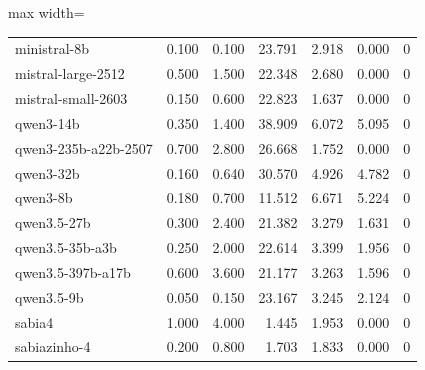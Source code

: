 \begin{table}[htbp]
\begin{adjustbox}{max width=\linewidth}
\begin{tabular}{lrrrrrr}
ministral-8b & 0.100 & 0.100 & 23.791 & 2.918 & 0.000 & 0 \\
mistral-large-2512 & 0.500 & 1.500 & 22.348 & 2.680 & 0.000 & 0 \\
mistral-small-2603 & 0.150 & 0.600 & 22.823 & 1.637 & 0.000 & 0 \\
qwen3-14b & 0.350 & 1.400 & 38.909 & 6.072 & 5.095 & 0 \\
qwen3-235b-a22b-2507 & 0.700 & 2.800 & 26.668 & 1.752 & 0.000 & 0 \\
qwen3-32b & 0.160 & 0.640 & 30.570 & 4.926 & 4.782 & 0 \\
qwen3-8b & 0.180 & 0.700 & 11.512 & 6.671 & 5.224 & 0 \\
qwen3.5-27b & 0.300 & 2.400 & 21.382 & 3.279 & 1.631 & 0 \\
qwen3.5-35b-a3b & 0.250 & 2.000 & 22.614 & 3.399 & 1.956 & 0 \\
qwen3.5-397b-a17b & 0.600 & 3.600 & 21.177 & 3.263 & 1.596 & 0 \\
qwen3.5-9b & 0.050 & 0.150 & 23.167 & 3.245 & 2.124 & 0 \\
sabia4 & 1.000 & 4.000 & 1.445 & 1.953 & 0.000 & 0 \\
sabiazinho-4 & 0.200 & 0.800 & 1.703 & 1.833 & 0.000 & 0 \\
\bottomrule
\end{tabular}
\end{adjustbox}
\end{table}
